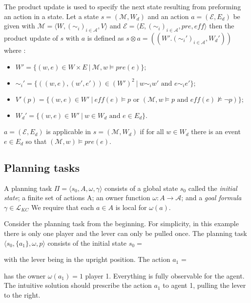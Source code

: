The product update is used to specify the next state resulting from preforming an action in a state.
Let a state $s = (\mathcal{M},W_d)$ and an action $a=(\mathcal{E},E_d)$ be given with $\mathcal{M}=\langle W,(\sim_i)_{i \in \mathcal{A}}, V\rangle $ and $\mathcal{E}=\langle E, (\sim_i)_{i \in \mathcal{A}},pre, \textit{eff} \rangle$
then the product update of $s$ with $a$ is defined as $s \otimes a = ((W'.(\sim_i')_{i \in \mathcal{A}}, W_d'))$ where :
 \begin{itemize}
   \item $W'=\{(w,e)\in W \times E ~|~ \mathcal{M}, w \models pre(e)\};$
   \item $\sim_i'=\{((w,e),(w',e')) \in (W')^2 ~|~ w \sim_i w' \text{ and } e \sim_i e'\};$
   \item $V'(p) = \{ (w,e) \in W' ~|~ \textit{eff}(e) \models p \text{ or } (\mathcal{M},w \models p \text{ and } \textit{eff}(e)\not \models \neg p)\};$
   \item $W_d' = \{ (w,e) \in W' ~|~ w \in W_d \text{ and } e \in E_d\}$.
 \end{itemize}
$a=(\mathcal{E}, E_d)$ is applicable in $s=(\mathcal{M},W_d)$ if for all $w \in W_d$ there is an event $e \in E_d$ so that $(\mathcal{M},w) \models pre(e)$.

\subsection{Planning tasks}


A planning task $\Pi = \langle s_0, A, \omega, \gamma \rangle$ consists of a global state $s_0$ called the \textit{initial state}; a finite set of actions A; an owner function $\omega: A \rightarrow \mathcal{A}$; and a \textit{goal formula} $\gamma \in \mathcal{L}_{KC}$ We require that each $a \in A$ is local for $\omega(a)$.

Consider the planning task from the beginning. For simplicity, in this example there is only one player and the lever can only be pulled once. The planning task $\langle s_0, \{ a_1 \} , \omega, p \rangle$ consists of the initial state $s_0 = $
with the lever being in the upright position. The action $a_1$ =
has the owner $\omega(a_1) = 1$ player 1. Everything is fully observable for the agent. The intuitive  solution should prescribe the action $a_1$ to agent 1, pulling the lever to the right.

